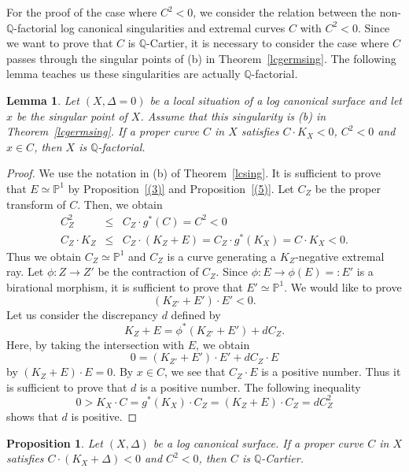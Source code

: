 \documentclass[12pt,twoside]{amsart}
\newtheorem{lem}[thm]{Lemma}
\newtheorem{prop}[thm]{Proposition}
\theoremstyle{definition}
\newcommand{\Q}{$\mathbb{Q}$}
\begin{document}
For the proof of the case where $C^2<0$, 
we consider the relation between the non-\Q-factorial 
log canonical singularities and 
extremal curves $C$ with $C^2<0$. 
Since we want to prove that $C$ is \Q-Cartier, 
it is necessary to consider the case where 
$C$ passes through the singular points of (b) in Theorem~\ref{lcgermsing}. 
The following lemma teaches us these singularities are actually \Q-factorial. 


\begin{lem}\label{qcartierlemma}
Let $(X, \Delta=0)$ be a local situation of a log canonical surface and 
let $x$ be the singular point of $X$. 
Assume that this singularity is {\em (b)} in Theorem~\ref{lcgermsing}. 
If a proper curve $C$ in $X$ satisfies 
$C\cdot K_X<0$, $C^2<0$ and $x \in C$, then $X$ is \Q-factorial. 
\end{lem}

\begin{proof}
We use the notation in (b) of Theorem~\ref{lcsing}. 
It is sufficient to prove that $E\simeq \mathbb{P}^1$ 
by Proposition~\ref{(3)} and Proposition~\ref{(5)}. 
Let $C_Z$ be the proper transform of $C$. 
Then, we obtain
\begin{eqnarray*}
C_Z^2 &\leq& C_Z\cdot g^*(C)=C^2<0\\
C_Z\cdot K_Z &\leq& C_Z\cdot (K_Z+E)=C_Z\cdot g^*(K_X)=C\cdot K_X<0.
\end{eqnarray*}
Thus we obtain $C_Z \simeq \mathbb{P}^1$ and 
$C_Z$ is a curve generating a $K_Z$-negative extremal ray. 
Let $\phi:Z \to Z'$ be the contraction of $C_Z$. 
Since $\phi:E \to \phi(E)=:E'$ is a birational morphism, 
it is sufficient to prove that $E'\simeq \mathbb{P}^1$. 
We would like to prove 
$$(K_{Z'}+E')\cdot E'<0.$$ 
Let us consider the discrepancy $d$ defined by 
$$K_Z+E=\phi^*(K_{Z'}+E')+dC_Z.$$
Here, by taking the intersection with $E$, we obtain 
$$0=(K_{Z'}+E')\cdot E'+dC_Z\cdot E$$
by $(K_Z+E)\cdot E=0$. 
By $x \in C$, we see that $C_Z\cdot E$ is a positive number. 
Thus it is sufficient to prove that $d$ is a positive number. 
The following inequality 
$$0>K_X\cdot C=g^*(K_X)\cdot C_Z=(K_Z+E)\cdot C_Z=dC_Z^2$$
shows that $d$ is positive. 
\end{proof}

\begin{prop}\label{qcartier}
Let $(X, \Delta)$ be a log canonical surface. 
If a proper curve $C$ in $X$ satisfies 
$C\cdot (K_X+\Delta)<0$ and $C^2<0$, then $C$ is \Q-Cartier. 
\end{prop}
\end{document}
